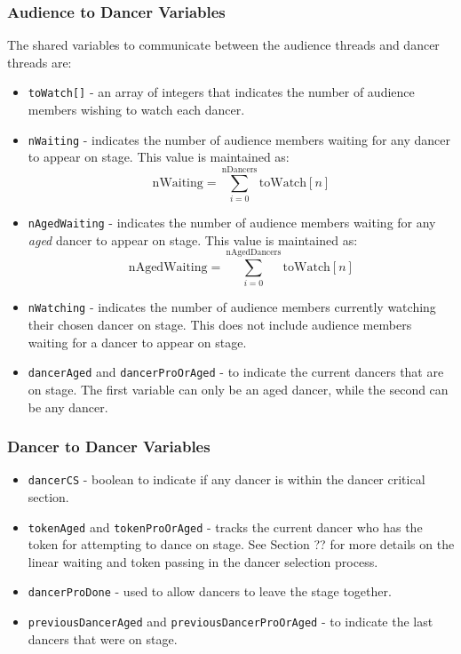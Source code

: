\documentclass[12pt,a4paper]{scrartcl}
\begin{document}
\subsubsection{Audience to Dancer Variables}
The shared variables to communicate between the audience threads and dancer threads are:
\begin{itemize}
    \item \texttt{toWatch[]} -
          an array of integers that indicates the number of audience members wishing to watch each dancer.
    \item \texttt{nWaiting} - 
          indicates the number of audience members waiting for any dancer to appear on stage.
          This value is maintained as: 
          \begin{equation*}
              \textrm{nWaiting} = \sum_{i=0}^{\textrm{nDancers}}\textrm{toWatch}[n]
          \end{equation*}
    \item \texttt{nAgedWaiting} - 
          indicates the number of audience members waiting for any \emph{aged} dancer to appear on stage.
          This value is maintained as:
          \begin{equation*}
              \textrm{nAgedWaiting} = \sum_{i=0}^{\textrm{nAgedDancers}}\textrm{toWatch}[n]
          \end{equation*}
    \item \texttt{nWatching} -
          indicates the number of audience members currently watching their chosen dancer on stage.
          This does not include audience members waiting for a dancer to appear on stage.
    \item \texttt{dancerAged} and \texttt{dancerProOrAged} - 
          to indicate the current dancers that are on stage.
          The first variable can only be an aged dancer, while the second can be any dancer.
\end{itemize}

\subsubsection{Dancer to Dancer Variables}
\begin{itemize}
    \item \texttt{dancerCS} - 
          boolean to indicate if any dancer is within the dancer critical section.
    \item \texttt{tokenAged} and \texttt{tokenProOrAged} - 
          tracks the current dancer who has the token for attempting to dance on stage.
          See Section ?? for more details on the linear waiting and token passing in the dancer selection process.
    \item \texttt{dancerProDone} - 
          used to allow dancers to leave the stage together.
    \item \texttt{previousDancerAged} and \texttt{previousDancerProOrAged} - 
          to indicate the last dancers that were on stage.
\end{itemize}
\end{document}
